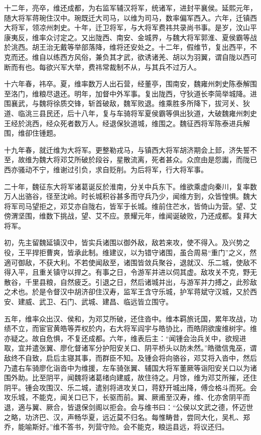 \documentclass[12pt,UTF8]{ctexbook}
\begin{document}
十二年，亮卒，维还成都，为右监军辅汉将军，统诸军，进封平襄侯。延熙元年，随大将军蒋琬住汉中。琬既迁大司马，以维为司马，数率偏军西入。六年，迁镇西大将军，领凉州刺史。十年，迁卫将军，与大将军费祎共录尚书事。是岁，汶山平康夷反，维率众讨定之。又出陇西、南安、金城界，与魏大将军郭淮、夏侯霸等战於洮西。胡王治无戴等举部落降，维将还安处之。十二年，假维节，复出西平，不克而还。维自以练西方风俗，兼负其才武，欲诱诸羌、胡以为羽翼，谓自陇以西可断而有也。每欲兴军大举，费祎常裁制不从，与其兵不过万人。

十六年春，祎卒。夏，维率数万人出石营，经董亭，围南安，魏雍州刺史陈泰解围至洛门，维粮尽退还。明年，加督中外军事。复出陇西，守狄道长李简举城降。进围襄武，与魏将徐质交锋，斩首破敌，魏军败退。维乘胜多所降下，拔河关、狄道、临洮三县民还，后十八年，复与车骑将军夏侯霸等俱出狄道，大破魏雍州刺史王经於洮西，经众死者数万人。经退保狄道城，维围之。魏征西将军陈泰进兵解围，维卻住锺题。

十九年春，就迁维为大将军。更整勒戎马，与镇西大将军胡济期会上邽，济失誓不至，故维为魏大将邓艾所破於段谷，星散流离，死者甚众。众庶由是怨讟，而陇已西亦骚动不宁，维谢过引负，求自贬削。为后将军，行大将军事。

二十年，魏征东大将军诸葛诞反於淮南，分关中兵东下。维欲乘虚向秦川，复率数万人出骆谷，径至沈岭。时长城积谷甚多而守兵乃少，闻维方到，众皆惶惧。魏大将军司马望拒之，邓艾亦自陇右，皆军于长城。维前住芒水，皆倚山为营。望、艾傍渭坚围，维数下挑战，望、艾不应。景耀元年，维闻诞破败，乃还成都。复拜大将军。

初，先主留魏延镇汉中，皆实兵诸围以御外敌，敌若来攻，使不得入。及兴势之役，王平捍拒曹爽，皆承此制。维建议，以为错守诸围，虽合周易“重门”之义，然適可御敌，不获大利。不若使闻敌至，诸围皆敛兵聚谷，退就汉、乐二城，使敌不得入平，且重关镇守以捍之。有事之日，令游军并进以伺其虚。敌攻关不克，野无散谷，千里县粮，自然疲乏。引退之日，然后诸城并出，与游军并力搏之，此殄敌之术也。於是令督汉中胡济卻住汉寿，监军王含守乐城，护军蒋斌守汉城，又於西安、建威、武卫、石门、武城、建昌、临远皆立围守。

五年，维率众出汉、侯和，为邓艾所破，还住沓中。维本羁旅讬国，累年攻战，功绩不立，而宦官黄皓等弄权於内，右大将军阎宇与皓协比，而皓阴欲废维树宇。维亦疑之。故自危惧，不复还成都。六年，维表后主：“闻锺会治兵关中，欲规进取，宜并遣张翼、廖化督诸军分护阳安关口、阴平桥头以防未然。”皓徵信鬼巫，谓敌终不自致，启后主寝其事，而群臣不知。及锺会将向骆谷，邓艾将入沓中，然后乃遣右车骑廖化诣沓中为维援，左车骑张翼、辅国大将军董厥等诣阳安关口以为诸围外助。比至阴平，闻魏将诸葛绪向建威，故住待之。月馀，维为邓艾所摧，还住阴平。锺会攻围汉、乐二城，遣别将进攻关口，蒋舒开城出降，傅佥格斗而死。会攻乐城，不能克，闻关口已下，长驱而前。翼、厥甫至汉寿，维、化亦舍阴平而退，適与翼、厥合，皆退保剑阁以拒会。会与维书曰：“公侯以文武之德，怀迈世之略，功济巴、汉，声畅华夏，远近莫不归名。每惟畴昔，尝同大化，吴札、郑乔，能喻斯好。”维不答书，列营守险。会不能克，粮运县远，将议还归。
\end{document}
